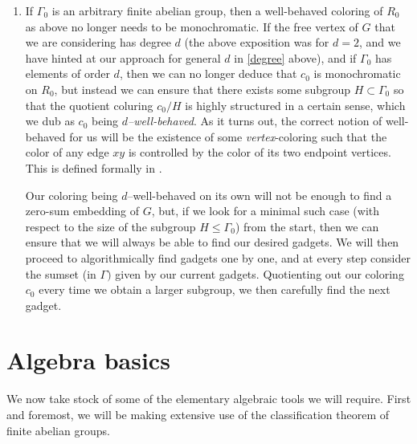\documentclass{article}
\theoremstyle{definition}
\begin{document}
\begin{enumerate}
    \item If $\Gamma_0$ is an arbitrary finite abelian group, then a well-behaved coloring of $R_0$ as above no longer needs to be monochromatic. If the free vertex of $G$ that we are considering has degree $d$ (the above exposition was for $d=2$, and we have hinted at our approach for general $d$ in \cref{degree} above), and if $\Gamma_0$ has elements of order $d$, then we can no longer deduce that $c_0$ is monochromatic on $R_0$, but instead we can ensure that there exists some subgroup $H\subset \Gamma_0$ so that the quotient coluring $c_0/H$ is highly structured in a certain sense, which we dub as $c_0$ being \emph{$d$--well-behaved}. As it turns out, the correct notion of well-behaved for us will be the existence of some \emph{vertex}-coloring such that the color of any edge $xy$ is controlled by the color of its two endpoint vertices. This is defined formally in . 

    Our coloring being $d$--well-behaved on its own will not be enough to find a zero-sum embedding of $G$, but, if we look for a minimal such case (with respect to the size of the subgroup $H\leqslant \Gamma_0$) from the start, then we can ensure that we will always be able to find our desired gadgets. We will then proceed to algorithmically find gadgets one by one, and at every step consider the sumset (in $\Gamma)$ given by our current gadgets. Quotienting out our coloring $c_0$ every time we obtain a larger subgroup, we then carefully find the next gadget. \label{WB_problem}
\end{enumerate}

\section{Algebra basics}\label{sec.algebra}

We now take stock of some of the elementary algebraic tools we will require. First and foremost, we will be making extensive use of the classification theorem of finite abelian groups.
\end{document}
